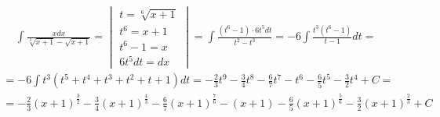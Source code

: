 \begin{gather*}\int \frac{xdx}{\sqrt[3]{x+1}-\sqrt{x+1}} = \begin{vmatrix}
t=\sqrt[6]{x+1} \\
t^6=x+1 \\
t^6-1=x \\
6t^5dt=dx
\end{vmatrix} = \int \frac{(t^6-1)\cdot 6t^5dt}{t^2-t^3}=-6\int \frac{t^3(t^6-1)}{t-1}dt = \end{gather*}
\begin{gather*}= -6\int t^3(t^5+t^4+t^3+t^2+t+1)dt = -\frac{2}{3}t^9-\frac{3}{4}t^8-\frac{6}{7}t^7- t^6-\frac{6}{5}t^5-\frac{3}{2}t^4 + C = \end{gather*}
\begin{gather*}= -\frac{2}{3}(x+1)^{\frac{3}{2}}-\frac{3}{4}(x+1)^{\frac{4}{3}} -\frac{6}{7}(x+1)^{\frac{7}{6}}-(x+1)- \frac{6}{5}(x+1)^{\frac{5}{6}}-\frac{3}{2}(x+1)^{\frac{2}{3}}+C\end{gather*}



